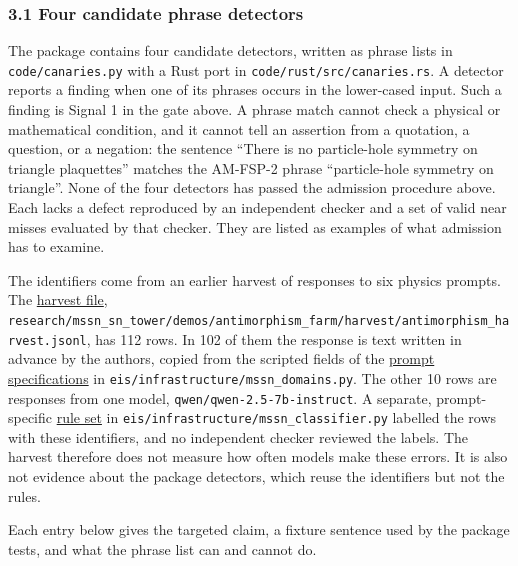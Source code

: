 \documentclass[
  11pt,
]{article}
\begin{document}
\hypertarget{four-candidate-phrase-detectors}{%
\subsubsection{3.1 Four candidate phrase
detectors}\label{four-candidate-phrase-detectors}}

The package contains four candidate detectors, written as phrase lists
in \texttt{\nolinkurl{code/canaries.py}} with a Rust port in
\texttt{\nolinkurl{code/rust/src/canaries.rs}}. A detector reports
a finding when one of its phrases occurs in the lower-cased input. Such
a finding is Signal 1 in the gate above. A phrase match cannot check a
physical or mathematical condition, and it cannot tell an assertion from
a quotation, a question, or a negation: the sentence ``There is no
particle-hole symmetry on triangle plaquettes'' matches the AM-FSP-2
phrase ``particle-hole symmetry on triangle''. None of the four
detectors has passed the admission procedure above. Each lacks a defect
reproduced by an independent checker and a set of valid near misses
evaluated by that checker. They are listed as examples of what admission
has to examine.

The identifiers come from an earlier harvest of responses to six physics
prompts. The
\href{https://github.com/dbccpage/the_symbol_game/blob/52cb5457f6c485ba548cfd292f6012a941ed22cf/research/mssn_sn_tower/demos/antimorphism_farm/harvest/antimorphism_harvest.jsonl}{harvest
file},
\texttt{\nolinkurl{research/mssn_sn_tower/demos/antimorphism_farm/harvest/antimorphism_harvest.jsonl}},
has 112 rows. In 102 of them the response is text written in advance by
the authors, copied from the scripted fields of the
\href{https://github.com/dbccpage/the_symbol_game/blob/52cb5457f6c485ba548cfd292f6012a941ed22cf/eis/infrastructure/mssn_domains.py}{prompt
specifications} in
\texttt{\nolinkurl{eis/infrastructure/mssn_domains.py}}.
The other 10 rows are responses from one model,
\texttt{\nolinkurl{qwen/qwen-2.5-7b-instruct}}. A separate,
prompt-specific
\href{https://github.com/dbccpage/the_symbol_game/blob/52cb5457f6c485ba548cfd292f6012a941ed22cf/eis/infrastructure/mssn_classifier.py}{rule
set} in
\texttt{\nolinkurl{eis/infrastructure/mssn_classifier.py}}
labelled the rows with these identifiers, and no independent checker
reviewed the labels. The harvest therefore does not measure how often
models make these errors. It is also not evidence about the package
detectors, which reuse the identifiers but not the rules.

Each entry below gives the targeted claim, a fixture sentence used by
the package tests, and what the phrase list can and cannot do.
\end{document}
